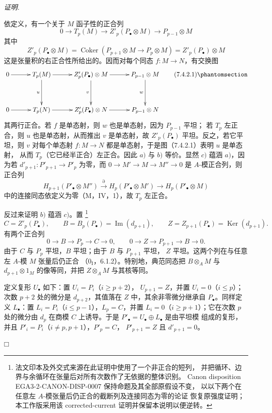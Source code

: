 \documentclass[UTF8,fontset=none,11pt,oneside,openany]{ctexbook}
\providecommand{\square}{\mdlgwhtsquare}
\newcommand{\SourceCorrectionNote}[1]{\footnote{#1}}
\newenvironment{proof}{%
  \par\smallskip\noindent\textit{证明.}\ %
}{\hfill$\square$\par}
\newcommand{\oldpage}[2][]{%
  \hypertarget{ega-source-page-#1-#2}{}%
  \marginnote{\scriptsize\textbf{#1}~|~#2}\ignorespaces}
\let\EGAOriginalLabel\label
\renewcommand{\label}[1]{\phantomsection\EGAOriginalLabel{#1}}
\begin{document}
\begin{proof}
依定义，有一个关于 $M$ 函子性的正合列
\[
  0\longrightarrow T_p(M)
  \longrightarrow Z'_p(P_\bullet\otimes M)
  \longrightarrow P_{p-1}\otimes M
\]
其中
\[
  Z'_p(P_\bullet\otimes M)
  =
  \operatorname{Coker}(P_{p+1}\otimes M\longrightarrow P_p\otimes M)
  =
  Z'_p(P_\bullet)\otimes M
\]
这是张量积的右正合性所给出的。因而对每个同态 $f:M\to N$，有交换图
\[
\xymatrix@C=30pt@R=38pt{
  0\ar[r]
  &T_p(M)\ar[r]\ar[d]_u
  &Z'_p(P_\bullet)\otimes M\ar[r]\ar[d]_v
  &P_{p-1}\otimes M\ar[d]_w
  \\
  0\ar[r]
  &T_p(N)\ar[r]
  &Z'_p(P_\bullet)\otimes N\ar[r]
  &P_{p-1}\otimes N
}
\tag{7.4.2.1}\label{III.7.4.2.1.fr}
\]
其两行正合。若 $f$ 是单态射，则 $w$ 也是单态射，因为 $P_{p-1}$ 平坦；
若 $T_p$ 左正合，则 $u$ 也是单态射，从而推出 $v$ 是单态射，故
$Z'_p(P_\bullet)$ 平坦。反之，若它平坦，则 $v$ 对每个单态射
$f:M\to N$ 都是单态射，于是图（7.4.2.1）表明 $u$ 是单态射，
从而 $T_p$（它已经半正合）左正合。因此 $a)$ 与 $b)$ 等价。显然
$c)$ 蕴涵 $a)$，因为若 $d'_{p+1}:P'_{p+1}\to P'_p$ 为零，而
$0\to M'\to M\to M''\to0$ 是 $A$-模正合列，则正合列
\[
  H_{p+1}(P'_\bullet\otimes M'')
  \xrightarrow{\partial}H_p(P'_\bullet\otimes M')
  \longrightarrow H_p(P'_\bullet\otimes M)
\]
\oldpage[III]{187}
中的连接同态依定义为零（M，IV，1），故 $T_p$ 左正合。

反过来证明 $b)$ 蕴涵 $c)$。置
\SourceCorrectionNote{法文印本及外交式来源在此证明中使用了一个非正合的短列，
并把循环、边界与余循环在张量后对所有次数作了无依据的整体识别。
Canon disposition EGA3-2-CANON-DISP-0007 保持命题及其全部原假设不变，
以以下两个在任意左 $A$-模张量后仍正合的截断列及连接同态为零的论证
恢复原强度证明；本工作版采用该 corrected-current 证明并保留本说明以便逆转。}
\[
 C=Z'_p(P_\bullet),\qquad
 B=B_p(P_\bullet)=\operatorname{Im}(d_{p+1}),\qquad
 Z=Z_{p+1}(P_\bullet)=\operatorname{Ker}(d_{p+1}).
\]
有两个正合列
\[
 0\longrightarrow B\longrightarrow P_p\longrightarrow C\longrightarrow0,
 \qquad
 0\longrightarrow Z\longrightarrow P_{p+1}\longrightarrow B\longrightarrow0.
\]
由于 $C$ 与 $P_p$ 平坦，$B$ 平坦；由于 $B$ 与 $P_{p+1}$ 平坦，
$Z$ 平坦。这两个列在与任意左 $A$-模 $M$ 张量后仍正合
（$0_{\mathrm I}$，6.1.2）。特别地，典范同态把 $B\otimes_A M$
与 $d_{p+1}\otimes1_M$ 的像等同，并把 $Z\otimes_A M$ 与其核等同。

定义复形 $U_\bullet$ 如下：置 $U_i=P_i$（$i\geq p+2$），
$U_{p+1}=Z$，并置 $U_i=0$（$i\leq p$）；次数 $p+2$ 处的微分是
$d_{p+2}$，其值落在 $Z$ 中，其余非零微分继承自 $P_\bullet$。同样定义
$L_\bullet$：置 $L_i=P_i$（$i\leq p-1$），$L_p=C$，并置
$L_i=0$（$i\geq p+1$）；它在次数 $p$ 处的微分由 $d_p$ 在商模
$C$ 上诱导。于是 $P'_\bullet=U_\bullet\oplus L_\bullet$ 是由平坦模
组成的复形，并且 $P'_i=P_i$（$i\ne p,p+1$），$P'_p=C$，
$P'_{p+1}=Z$ 且 $d'_{p+1}=0$。


\end{proof}
\end{document}
